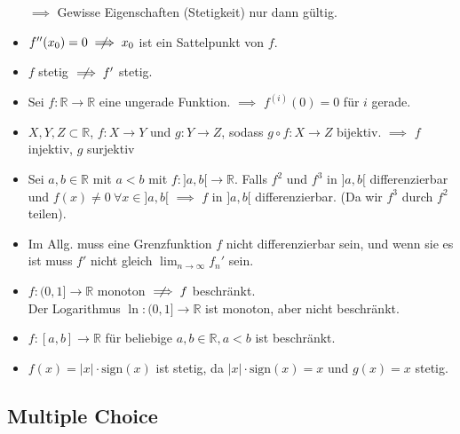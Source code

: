 \documentclass[a4paper,fontsize = 7pt]{scrartcl}
\def\limn{\lim_{n\to \infty}}
\def\R{\mathbb{R}}
\begin{document}
\begin{itemize}
		$ \implies$ Gewisse Eigenschaften (Stetigkeit) nur dann gültig.
	\item $f''(x_0) = 0 \centernot \implies x_0$ ist ein Sattelpunkt von $f$. 
	\item $f$ stetig $\centernot \implies f'$ stetig.
	\item Sei $f : \R \to \R$ eine ungerade Funktion. $\implies$ $f^{(i)} (0) = 0$ für $i$ gerade.
	\item $X,Y,Z \subset \R$, $f: X \to Y$ und $g: Y \to Z$, sodass $g \circ f : X \to Z$ bijektiv. 
		$\implies$ $f$ injektiv, $g$ surjektiv
	\item Sei $a,b \in \R$ mit $a < b$ mit $f: ]a,b[ \to \R$. Falls $f^2$ und $f^3$ in $]a,b[$
		differenzierbar und $f(x) \neq 0~\forall x \in ]a,b[$ $ \implies$ $f$ in $]a,b[$ differenzierbar. (Da wir $f^3$ durch $f^2$ teilen).
	\item Im Allg. muss eine Grenzfunktion $f$ nicht differenzierbar sein, und wenn sie es ist muss $f'$ nicht gleich $\limn f_n'$ sein.
	
	\item $f: (0,1] \to \R$ monoton $\centernot \implies f$ beschränkt.
	\\ Der Logarithmus $\ln: (0,1] \to \R$ ist monoton, aber nicht beschränkt. 
  \item $f: [a, b] \to \R$ für beliebige $a, b \in \R, a < b$ ist beschränkt.
  \item $f(x) = |x| \cdot \text{sign}(x)$ ist stetig, da $|x| \cdot \text{sign}(x) = x$ und $g(x)=x$ stetig.
\end{itemize}

\subsection{Multiple Choice}
\end{document}
